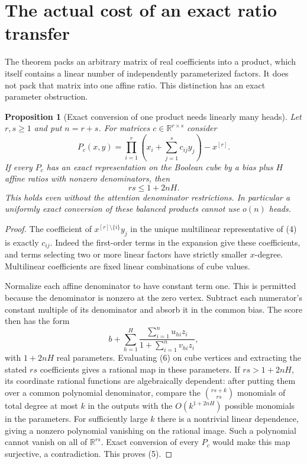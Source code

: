 \documentclass[11pt]{article}
\newtheorem{proposition}[theorem]{Proposition}
\begin{document}
\section*{The actual cost of an exact ratio transfer}
The theorem packs an arbitrary matrix of real coefficients into a
product, which itself contains a linear number of independently
parameterized factors. It does not pack that matrix into one affine ratio.
This distinction has an exact parameter obstruction.

\begin{proposition}[Exact conversion of one product needs linearly many heads]
Let $r,s\ge1$ and put $n=r+s$. For matrices $c\in\mathbb R^{r\times s}$
consider
\[
 P_c(x,y)=\prod_{i=1}^r\left(x_i+\sum_{j=1}^s c_{ij}y_j\right)-x^{[r]}.
 \tag{4}
\]
If every $P_c$ has an exact representation on the Boolean cube by a
bias plus $H$ affine ratios with nonzero denominators, then
\[
 rs\le 1+2nH.
 \tag{5}
\]
This holds even without the attention denominator restrictions. In
particular a uniformly exact conversion of these balanced products
cannot use $o(n)$ heads.
\end{proposition}
\begin{proof}
The coefficient of $x^{[r]\setminus\{i\}}y_j$ in the unique multilinear
representative of (4) is exactly $c_{ij}$. Indeed the first-order terms
in the expansion give these coefficients, and terms selecting two or
more linear factors have strictly smaller $x$-degree.
Multilinear coefficients are fixed linear combinations of cube values.

Normalize each affine denominator to have constant term one. This is
permitted because the denominator is nonzero at the zero vertex.
Subtract each numerator's constant multiple of its denominator and
absorb it in the common bias. The score then has the form
\[
 b+\sum_{h=1}^H\frac{\sum_{i=1}^n u_{hi}z_i}
                            {1+\sum_{i=1}^n v_{hi}z_i},
 \tag{6}
\]
with $1+2nH$ real parameters. Evaluating (6) on cube vertices and
extracting the stated $rs$ coefficients gives a rational map in these
parameters. If $rs>1+2nH$, its coordinate rational functions are
algebraically dependent: after putting them over a common polynomial
denominator, compare the $\binom{rs+k}{rs}$ monomials of total degree
at most $k$ in the outputs with the $O(k^{1+2nH})$ possible monomials
in the parameters. For sufficiently large $k$ there is a nontrivial
linear dependence, giving a nonzero polynomial vanishing on the
rational image. Such a polynomial cannot vanish on all of
$\mathbb R^{rs}$. Exact conversion of every $P_c$ would make this map
surjective, a contradiction. This proves (5).
\end{proof}
\end{document}

